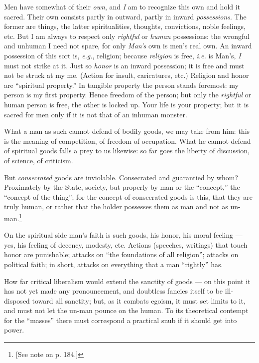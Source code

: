 Men have somewhat of their \textit{own}, and \textit{I} am to recognize this 
own and hold it sacred. Their own consists partly in outward, partly in inward 
\textit{possessions}. The former are things, the latter spiritualities, 
thoughts, convictions, noble feelings, etc. But I am always to respect only 
\textit{rightful} or \textit{human} possessions: the wrongful and unhuman I 
need not spare, for only \textit{Man's} own is men's real own. An inward 
possession of this sort is, \textit{e.g.}, religion; because 
\textit{religion} is free, \textit{i.e.} is Man's, \textit{I} must not strike 
at it. Just so \textit{honor} is an inward possession; it is free and must not 
be struck at my me. (Action for insult, caricatures, etc.) Religion and honor 
are ``spiritual property.'' In tangible property the person stands foremost: 
my person is my first property. Hence freedom of the person; but only the 
\textit{rightful} or human person is free, the other is locked up. Your life 
is your property; but it is sacred for men only if it is not that of an 
inhuman monster.

What a man as such cannot defend of bodily goods, we may take from him: this 
is the meaning of competition, of freedom of occupation. What he cannot defend 
of spiritual goods falls a prey to us likewise: so far goes the liberty of 
discussion, of science, of criticism.

But \textit{consecrated} goods are inviolable. Consecrated and guarantied by 
whom? Proximately by the State, society, but properly by man or the 
``concept,'' the ``concept of the thing''; for the concept of consecrated 
goods is this, that they are truly human, or rather that the holder possesses 
them as man and not as un-man.\footnote{[See note on p. 184.]}

On the spiritual side man's faith is such goods, his honor, his moral feeling --- yes, his feeling of decency, modesty, etc. Actions (speeches, writings) 
that touch honor are punishable; attacks on ``the foundations of all 
religion''; attacks on political faith; in short, attacks on everything that 
a man ``rightly'' has.

How far critical liberalism would extend the sanctity of goods --- on this 
point it has not yet made any pronouncement, and doubtless fancies itself to 
be ill-disposed toward all sanctity; but, as it combats egoism, it must set 
limits to it, and must not let the un-man pounce on the human. To its 
theoretical contempt for the ``masses'' there must correspond a practical 
snub if it should get into power.

